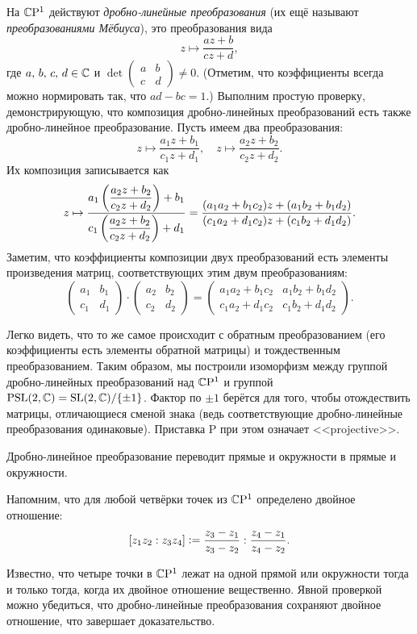 На $\mathbb{C}\mathrm{P}^1$ действуют \textit{дробно-линейные преобразования} (их ещё называют \textit{преобразованиями Мёбиуса}), это преобразования вида
\[
	z \mapsto \frac{az + b}{cz + d},
\]
где $a,\,b,\,c,\,d \in \mathbb{C}$ и
$\det\begin{pmatrix}
	a & b\\
	c & d
\end{pmatrix} \ne 0$. (Отметим, что коэффициенты всегда можно нормировать так, что $ad - bc = 1$.) Выполним простую проверку, демонстрирующую, что композиция дробно-линейных преобразований есть также дробно-линейное преобразование. Пусть имеем два преобразования:
\[
	z \mapsto \frac{a_1z + b_1}{c_1z + d_1},\quad
	z \mapsto \frac{a_2z + b_2}{c_2z + d_2}.
\]
Их композиция записывается как
\[
	z \mapsto \frac{a_1\left(\dfrac{a_2z + b_2}{c_2z + d_2}\right) + b_1}{c_1\left(\dfrac{a_2z + b_2}{c_2z + d_2}\right) + d_1} = \frac{(a_1a_2 + b_1c_2)z + (a_1b_2 + b_1d_2)}{(c_1a_2 + d_1c_2)z + (c_1b_2 + d_1d_2)}.
\]
Заметим, что коэффициенты композиции двух преобразований есть элементы произведения матриц, соответствующих этим двум преобразованиям:
\[
	\begin{pmatrix}
		a_1 & b_1\\
		c_1 & d_1
	\end{pmatrix} \cdot
	\begin{pmatrix}
		a_2 & b_2\\
		c_2 & d_2
	\end{pmatrix} =
	\begin{pmatrix}
		a_1a_2 + b_1c_2 & a_1b_2 + b_1d_2\\
		c_1a_2 + d_1c_2 & c_1b_2 + d_1d_2
	\end{pmatrix}.
\]

Легко видеть, что то же самое происходит с обратным преобразованием (его коэффициенты есть элементы обратной матрицы) и тождественным преобразованием. Таким образом, мы построили изоморфизм между группой дробно-линейных преобразований над $\mathbb{C}\mathrm{P}^1$ и группой $\mathrm{PSL}(2, \mathbb{C}) = \mathrm{SL}(2, \mathbb{C}) / \{\pm 1\}$. Фактор по $\pm 1$ берётся для того, чтобы отождествить матрицы, отличающиеся сменой знака (ведь соответствующие дробно-линейные преобразования одинаковые). Приставка $\mathrm{P}$ при этом означает <<projective>>.

\begin{proposition}
	Дробно-линейное преобразование переводит прямые и окружности в прямые и окружности.
\end{proposition}

\begin{firstproof}
	Напомним, что для любой четвёрки точек из $\mathbb{C}\mathrm{P}^1$ определено двойное отношение:
	\[
		[z_1z_2 : z_3z_4] \vcentcolon = \frac{z_3 - z_1}{z_3 - z_2} : \frac{z_4 - z_1}{z_4 - z_2}.
	\]

	Известно, что четыре точки в $\mathbb{C}\mathrm{P}^1$ лежат на одной прямой или окружности тогда и только тогда, когда их двойное отношение вещественно. Явной проверкой можно убедиться, что дробно-линейные преобразования сохраняют двойное отношение, что завершает доказательство.
\end{firstproof}

